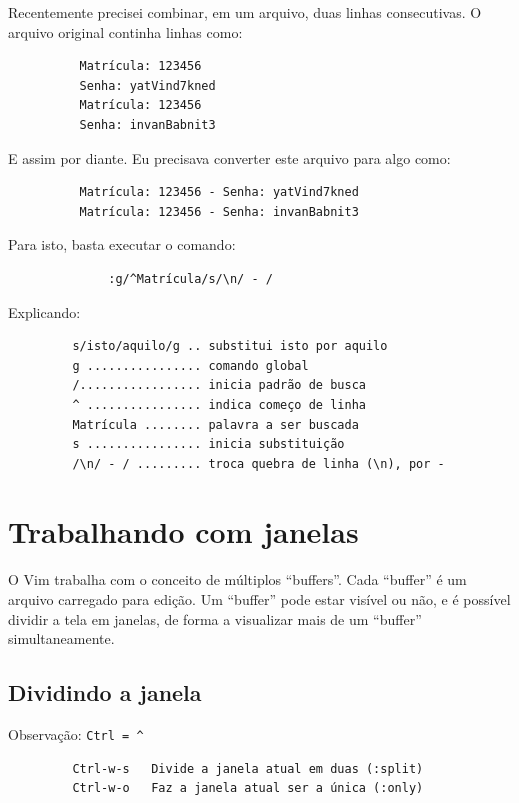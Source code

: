 \documentclass[10pt,a4paper,openany]{book}
\begin{document}
Recentemente precisei combinar, em um arquivo, duas linhas
consecutivas. O arquivo original continha linhas como:

\begin{verbatim}
		  Matrícula: 123456
		  Senha: yatVind7kned
		  Matrícula: 123456
		  Senha: invanBabnit3
\end{verbatim}

E assim por diante. Eu precisava converter este arquivo para algo como:

\begin{verbatim}
		  Matrícula: 123456 - Senha: yatVind7kned
		  Matrícula: 123456 - Senha: invanBabnit3
\end{verbatim}

Para isto, basta executar o comando:

\begin{verbatim}
			  :g/^Matrícula/s/\n/ - /
\end{verbatim}

Explicando:

\begin{verbatim}
		 s/isto/aquilo/g .. substitui isto por aquilo
		 g ................ comando global
		 /................. inicia padrão de busca
		 ^ ................ indica começo de linha
		 Matrícula ........ palavra a ser buscada
		 s ................ inicia substituição
		 /\n/ - / ......... troca quebra de linha (\n), por -
\end{verbatim}

\chapter{Trabalhando com janelas}\label{cha:Trabalhando com janelas}

O Vim trabalha com o conceito de múltiplos ``buffers''. Cada
``buffer'' é um arquivo carregado para edição. Um ``buffer'' pode
estar visível ou não, e é possível dividir a tela em janelas, de forma
a visualizar mais de um ``buffer'' simultaneamente.

\section{Dividindo a janela }
Observação: \verb+Ctrl = ^+

\begin{verbatim}
		 Ctrl-w-s   Divide a janela atual em duas (:split)
		 Ctrl-w-o   Faz a janela atual ser a única (:only)
\end{verbatim}
\end{document}
